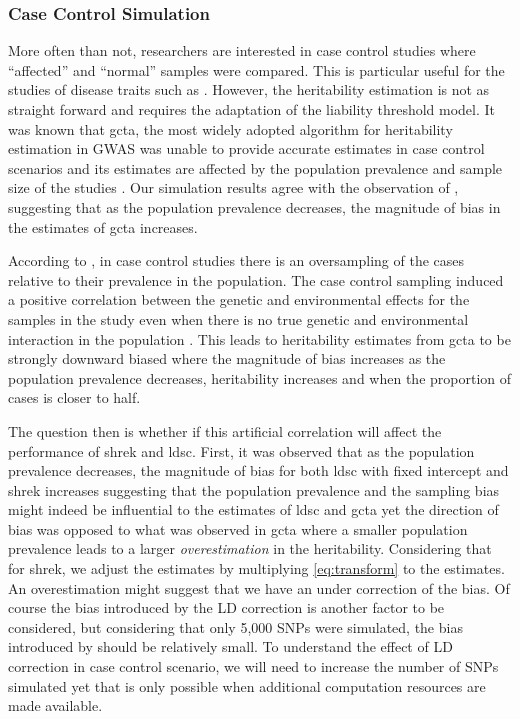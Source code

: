 	\subsubsection{Case Control Simulation}
	More often than not, researchers are interested in case control studies where ``affected'' and ``normal'' samples were compared. 
	This is particular useful for the studies of disease traits such as .
	However, the heritability estimation is not as straight forward and requires the adaptation of the liability threshold model.
	It was known that \gls{gcta}, the most widely adopted algorithm for heritability estimation in \gls{GWAS} was unable to provide accurate estimates in case control scenarios and its estimates are affected by the population prevalence and sample size of the studies \citep{Golan2014}.
	Our simulation results agree with the observation of \citet{Golan2014}, suggesting that as the population prevalence decreases, the magnitude of bias in the estimates of \gls{gcta} increases.
	
	According to \citet{Golan2014}, in case control studies there is an oversampling of the cases relative to their prevalence in the population.
	The case control sampling induced a positive correlation between the genetic and environmental effects for the samples in the study even when there is no true genetic and environmental interaction in the population \citep{Golan2014}.
	This leads to heritability estimates from \gls{gcta} to be strongly downward biased where the magnitude of bias increases as the population prevalence decreases, heritability increases and when the proportion of cases is closer to half.
	
	The question then is whether if this artificial correlation will affect the performance of \gls{shrek} and \gls{ldsc}.
	First, it was observed that as the population prevalence decreases, the magnitude of bias for both \gls{ldsc} with fixed intercept and \gls{shrek} increases suggesting that the population prevalence and the sampling bias might indeed be influential to the estimates of \gls{ldsc} and \gls{gcta} yet the direction of bias was opposed to what was observed in \gls{gcta} where a smaller population prevalence leads to a larger \emph{overestimation} in the heritability.
	Considering that for \gls{shrek}, we adjust the estimates by multiplying \cref{eq:transform} to the estimates. 
	An overestimation might suggest that we have an under correction of the bias. 
	Of course the bias introduced by the \gls{LD} correction is another factor to be considered, but considering that only 5,000 \glspl{SNP} were simulated, the bias introduced by  should be relatively small.
	To understand the effect of \gls{LD} correction in case control scenario, we will need to increase the number of \glspl{SNP} simulated yet that is only possible when additional computation resources are made available.
	
